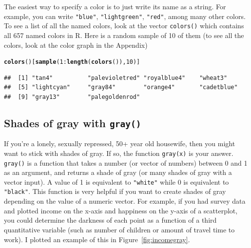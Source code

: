\documentclass{tufte-book}\usepackage[]{graphicx}\usepackage[]{color}
\makeatletter
\newcommand{\hlnum}[1]{\textcolor[rgb]{0.686,0.059,0.569}{#1}}%
\newcommand{\hlopt}[1]{\textcolor[rgb]{0,0,0}{#1}}%
\newcommand{\hlstd}[1]{\textcolor[rgb]{0.345,0.345,0.345}{#1}}%
\newcommand{\hlkwd}[1]{\textcolor[rgb]{0.737,0.353,0.396}{\textbf{#1}}}%
\newenvironment{kframe}{%
 \def\at@end@of@kframe{}%
 \ifinner\ifhmode%
  \def\at@end@of@kframe{\end{minipage}}%
  \begin{minipage}{\columnwidth}%
 \fi\fi%
 \def\FrameCommand##1{\hskip\@totalleftmargin \hskip-\fboxsep
 \colorbox{shadecolor}{##1}\hskip-\fboxsep
     \hskip-\linewidth \hskip-\@totalleftmargin \hskip\columnwidth}%
 \MakeFramed {\advance\hsize-\width
   \@totalleftmargin\z@ \linewidth\hsize
   \@setminipage}}%
 {\par\unskip\endMakeFramed%
 \at@end@of@kframe}
\newenvironment{knitrout}{}{} %
\makeatother
\begin{document}
\begin{footnotesize}
The easiest way to specify a color is to just write its name as a string. For example, you can write \texttt{"blue"}, \texttt{"lightgreen"}, \texttt{"red"}, among many other colors. To see a list of all the named colors, look at the vector \texttt{colors()} which contains all 657 named colors in R. Here is a random sample of 10 of them (to see all the colors, look at the color graph in the Appendix)
  
\begin{footnotesize}
\begin{knitrout}
\color{fgcolor}\begin{kframe}
\begin{alltt}
\hlkwd{colors}\hlstd{()[}\hlkwd{sample}\hlstd{(}\hlnum{1}\hlopt{:}\hlkwd{length}\hlstd{(}\hlkwd{colors}\hlstd{()),} \hlnum{10}\hlstd{)]}
\end{alltt}
\begin{verbatim}
##  [1] "tan4"          "palevioletred" "royalblue4"    "wheat3"       
##  [5] "lightcyan"     "gray84"        "orange4"       "cadetblue"    
##  [9] "gray13"        "palegoldenrod"
\end{verbatim}
\end{kframe}
\end{knitrout}
\end{footnotesize}

\subsection{Shades of gray with \texttt{gray()}}
  
If you're a lonely, sexually repressed, 50+ year old housewife, then you might want to stick with shades of gray. If so, the function \texttt{gray(x)} is your answer. \texttt{gray()} is a function that takes a number (or vector of numbers) between 0 and 1 as an argument, and returns a shade of gray (or many shades of gray with a vector input). A value of 1 is equivalent to \texttt{"white"} while 0 is equivalent to \texttt{"black"}. This function is very helpful if you want to create shades of gray depending on the value of a numeric vector. For example, if you had survey data and plotted income on the x-axis and happiness on the y-axis of a scatterplot, you could determine the darkness of each point as a function of a third quantitative variable (such as number of children or amount of travel time to work). I plotted an example of this in Figure~\ref{fig:incomegray}.


\end{footnotesize}
\end{document}
